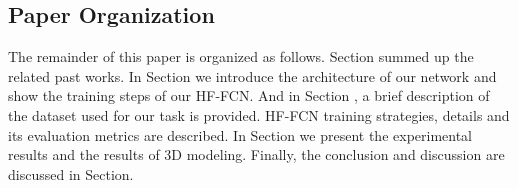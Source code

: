 \subsection{Paper Organization}
\setlength{\parindent}{2ex}The remainder of this paper is organized as follows. Section \uppercase\expandafter{} summed up the related past works. In Section \uppercase\expandafter{} we introduce the architecture of our network and show the training steps of our HF-FCN. And in Section \uppercase\expandafter{}, a brief description of the dataset used for our task is provided. HF-FCN training strategies, details and its evaluation metrics are described. In Section \uppercase\expandafter{} we present the experimental results and the results of 3D modeling. Finally, the conclusion and discussion are discussed in Section\uppercase\expandafter{}.
